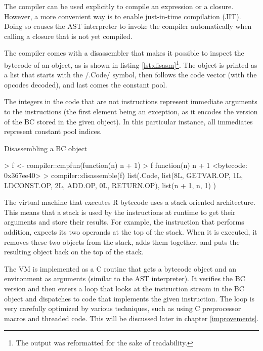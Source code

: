 {The compiler can be used explicitly to compile an expression or a closure. However, a more convenient way is to enable just-in-time compilation (JIT). Doing so causes the AST interpreter to invoke the compiler automatically when calling a closure that is not yet compiled.

The compiler comes with a disassembler that makes it possible to inspect the bytecode of an object, as is shown in listing \ref{lst:disasm}\footnote{The output was reformatted for the sake of readability.}. The object is printed as a list that starts with the \rinline/.Code/ symbol, then follows the code vector (with the opcodes decoded), and last comes the constant pool.

The integers in the code that are not instructions represent immediate arguments to the instructions (the first element being an exception, as it encodes the version of the BC stored in the given object). In this particular instance, all immediates represent constant pool indices.

\begin{listing}[htbp]
  \caption{\label{lst:disasm}Disassembling a BC object}
  \begin{rcode}
> f <- compiler::cmpfun(function(n) n + 1)
> f
function(n) n + 1
<bytecode: 0x367ee40>
> compiler::disassemble(f)
list(.Code,
     list(8L,
          GETVAR.OP, 1L,
          LDCONST.OP, 2L,
          ADD.OP, 0L,
          RETURN.OP),
     list(n + 1,
          n,
          1)
)
  \end{rcode}
\end{listing}

The virtual machine that executes R bytecode uses a stack oriented architecture. This means that a stack is used by the instructions at runtime to get their arguments and store their results. For example, the instruction that performs addition, expects its two operands at the top of the stack. When it is executed, it removes these two objects from the stack, adds them together, and puts the resulting object back on the top of the stack.

The VM is implemented as a C routine that gets a bytecode object and an environment as arguments (similar to the AST interpreter). It verifies the BC version and then enters a loop that looks at the instruction stream in the BC object and dispatches to code that implements the given instruction. The loop is very carefully optimized by various techniques, such as using C preprocessor macros and threaded code. This will be discussed later in chapter \ref{improvements}.

}
